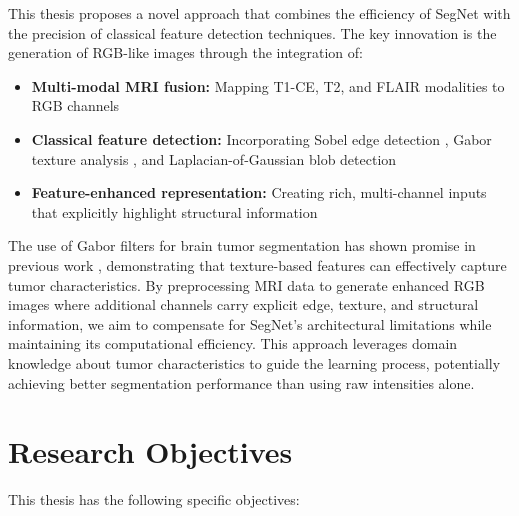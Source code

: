 This thesis proposes a novel approach that combines the efficiency of SegNet with the precision of classical feature detection techniques. The key innovation is the generation of RGB-like images through the integration of:

\begin{itemize}
    \item \textbf{Multi-modal MRI fusion:} Mapping T1-CE, T2, and FLAIR modalities to RGB channels
    \item \textbf{Classical feature detection:} Incorporating Sobel edge detection \cite{sobel1968isotropic}, Gabor texture analysis \cite{gabor1946theory}, and Laplacian-of-Gaussian blob detection \cite{gonzalez2002digital}
    \item \textbf{Feature-enhanced representation:} Creating rich, multi-channel inputs that explicitly highlight structural information
\end{itemize}

The use of Gabor filters for brain tumor segmentation has shown promise in previous work \cite{fathi2013automatic}, demonstrating that texture-based features can effectively capture tumor characteristics. By preprocessing MRI data to generate enhanced RGB images where additional channels carry explicit edge, texture, and structural information, we aim to compensate for SegNet's architectural limitations while maintaining its computational efficiency. This approach leverages domain knowledge about tumor characteristics to guide the learning process, potentially achieving better segmentation performance than using raw intensities alone.

\section{Research Objectives}
\label{sec:objectives}

This thesis has the following specific objectives:

